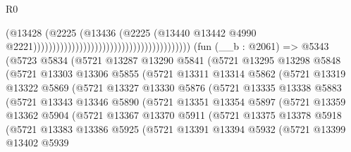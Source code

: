 \begin{lexlean}{R0}
\begin{coremodule}
                                                                            (@13428
                                                                              (@2225
                                                                                (@13436
                                                                                  (@2225
                                                                                    (@13440
                                                                                      @13442
                                                                                      @4990
                                                                                      @2221)))))))))))))))))))))))))))))))))))))))))
    (fun (__b : @2061) =>
    @5343
      (@5723
        @5834
        (@5721
          @13287
          @13290
          @5841
          (@5721
            @13295
            @13298
            @5848
            (@5721
              @13303
              @13306
              @5855
              (@5721
                @13311
                @13314
                @5862
                (@5721
                  @13319
                  @13322
                  @5869
                  (@5721
                    @13327
                    @13330
                    @5876
                    (@5721
                      @13335
                      @13338
                      @5883
                      (@5721
                        @13343
                        @13346
                        @5890
                        (@5721
                          @13351
                          @13354
                          @5897
                          (@5721
                            @13359
                            @13362
                            @5904
                            (@5721
                              @13367
                              @13370
                              @5911
                              (@5721
                                @13375
                                @13378
                                @5918
                                (@5721
                                  @13383
                                  @13386
                                  @5925
                                  (@5721
                                    @13391
                                    @13394
                                    @5932
                                    (@5721
                                      @13399
                                      @13402
                                      @5939

\end{coremodule}
\end{lexlean}
